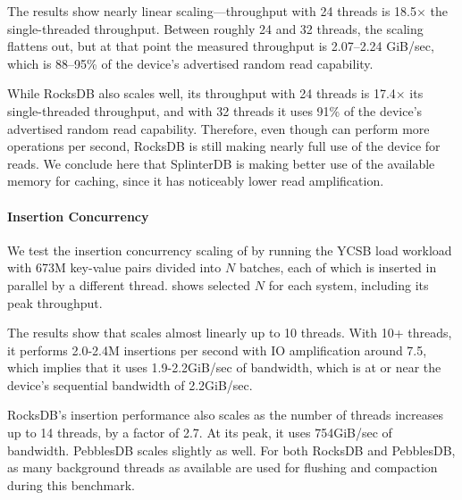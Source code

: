 The results show nearly linear scaling---throughput with 24 threads is
18.5$\times$ the single-threaded throughput. Between roughly 24 and 32 threads,
the scaling flattens out, but at that point the measured throughput is
2.07--2.24 GiB/sec, which is 88--95\% of the device's advertised random read
capability.

While RocksDB also scales well, its throughput with 24 threads is 17.4$\times$
its single-threaded throughput, and with 32 threads it uses 91\% of the
device's advertised random read capability. Therefore, even though \sysname can
perform more operations per second, RocksDB is still making nearly full use of
the device for reads. We conclude here that SplinterDB is making better use of
the available memory for caching, since it has noticeably lower read
amplification.


\paragraph{Insertion Concurrency}
We test the insertion concurrency scaling of \sysname by running the YCSB load
workload with 673M key-value pairs divided into $N$ batches, each of which
is inserted in parallel by a different thread. 
shows selected $N$ for each system, including its peak throughput.

The results show that \sysname scales almost linearly up to 10 threads. With
10+ threads, it performs 2.0-2.4M insertions per second with IO amplification
around 7.5, which implies that it uses 1.9-2.2GiB/sec of bandwidth, which is at
or near the device's sequential bandwidth of 2.2GiB/sec.

RocksDB's insertion performance also scales as the number of threads increases
up to 14 threads, by a factor of 2.7. At its peak, it uses 754GiB/sec of
bandwidth. PebblesDB scales slightly as well.  For both RocksDB and PebblesDB,
as many background threads as available are used for flushing and compaction
during this benchmark.

